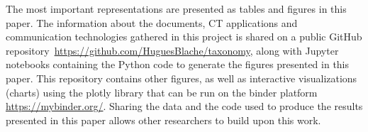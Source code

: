 
The most important representations are presented as tables and figures in this paper. The information about the documents, \acrshort{CT} applications and communication technologies gathered in this project is shared on a public GitHub repository~\url{https://github.com/HuguesBlache/taxonomy}, along with Jupyter notebooks containing the Python code to generate the figures presented in this paper. This repository contains other figures, as well as interactive visualizations (charts) using the plotly library that can be run on the binder platform \url{https://mybinder.org/}. Sharing the data and the code used to produce the results presented in this paper allows other researchers to build upon this work. 




 

